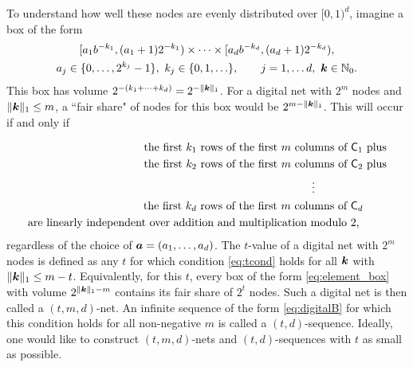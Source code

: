 \documentclass{svproc}
\begin{document}
To understand how well these nodes are evenly distributed over $[0,1)^d$, imagine a box of the form
\begin{multline} \label{eq:element_box}
	[a_1 b^{-k_1}, (a_1 + 1) 2^{-k_1}) \times \cdots \times [a_d b^{-k_d}, (a_d + 1) 2^{-k_d}), \\
	a_j \in \{0, \ldots, 2^{k_j} - 1\}, \ k_j \in \{0,1, \ldots \}, \qquad j =1, \ldots d, \ {\boldsymbol{k}} \in {\mathbb{N}}_0.
\end{multline}
This box has volume $2^{-(k_1 + \cdots +k_d)} = 2^{-\lVert{\boldsymbol{k}}\rVert_1}$.  For a digital net with $2^m$ nodes and $\lVert {\boldsymbol{k}} \rVert_1 \le m$, a ``fair share" of nodes for this box would be $2^{m- \lVert {\boldsymbol{k}} \rVert_1}$.  This will occur if and only if

\begin{equation} \label{eq:tcond}
\begin{aligned}
	\text{the first $k_1$ rows of the first $m$ columns of $\mathsf{C}_1$} & \text{ plus} \\
	\text{the first $k_2$ rows of the first $m$ columns of $\mathsf{C}_2$} & \text{ plus} \\
	 \vdots \hspace{10ex} & \\
	\text{ the first $k_d$ rows of the first $m$ columns of $\mathsf{C}_d$} &\\
	\text{are linearly independent over addition and multiplication modulo $2$, }
\end{aligned}
\end{equation}
regardless of the choice of ${\boldsymbol{a}} = (a_1, \ldots, a_d)$.  The $t$-value of a digital net with $2^m$ nodes is defined as any $t$ for which condition \eqref{eq:tcond} holds for all ${\boldsymbol{k}}$ with $\lVert {\boldsymbol{k}} \rVert_1 \le m-t$.  Equivalently, for this $t$, every box of the form \eqref{eq:element_box} with volume $2^{\lVert {\boldsymbol{k}} \rVert_1 - m}$ contains its fair share of $2^t$ nodes.  Such a digital net is then called a $(t,m,d)$-net.  An infinite sequence of the form \eqref{eq:digitalB} for which this condition holds for all non-negative $m$ is called a  $(t,d)$-sequence. Ideally, one would like to construct $(t,m,d)$-nets and $(t,d)$-sequences with $t$ as small as possible.
\end{document}
